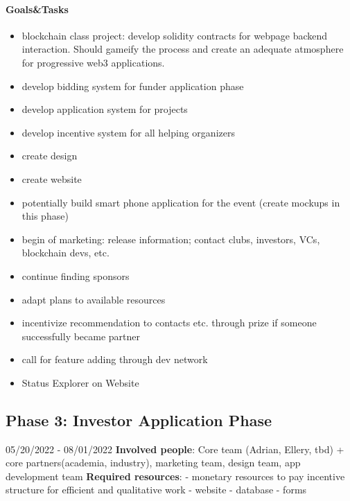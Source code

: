 \paragraph{Goals\&Tasks}
\begin{itemize}
    \item blockchain class project: develop solidity contracts for webpage backend interaction. Should gameify the process and create an adequate atmosphere for progressive web3 applications.
    \item develop bidding system for funder application phase
    \item develop application system for projects
    \item develop incentive system for all helping organizers
    \item create design
    \item create website
    \item potentially build smart phone application for the event (create mockups in this phase)
    \item begin of marketing: release information; contact clubs, investors, VCs, blockchain devs, etc.
    \item continue finding sponsors
    \item adapt plans to available resources
    \item incentivize recommendation to contacts etc. through prize if someone successfully became partner
    \item call for feature adding through dev network
    \item Status Explorer on Website
\end{itemize}

\subsection*{Phase 3: Investor Application Phase}
05/20/2022 - 08/01/2022
\textbf{Involved people}:
Core team (Adrian, Ellery, tbd) + core partners(academia, industry), marketing team, design team, app development team
\textbf{Required resources}:
- monetary resources to pay incentive structure for efficient and qualitative work
- website
- database
- forms

